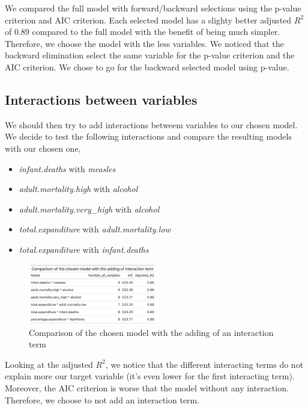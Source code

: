 We compared the full model with forward/backward selections using the p-value criterion and AIC criterion. Each selected model has a slighty better adjusted $R^2$ of $0.89$ compared to the full model with the benefit of being much simpler. Therefore, we choose the model with the less variables. We noticed that the backward elimination select the same variable for the p-value criterion and the AIC criterion. We chose to go for the backward selected model using p-value.

\subsection{Interactions between variables}

We should then try to add interactions betweem variables to our chosen model. We decide to test the following interactions and compare the resulting models with our chosen one,

\begin{itemize}
	\item \textit{infant.deaths} with \textit{measles}
	\item \textit{adult.mortality.high} with \textit{alcohol}
	\item \textit{adult.mortality.very\_high} with \textit{alcohol}
	\item \textit{total.expanditure} with \textit{adult.mortality.low}
	\item \textit{total.expanditure} with \textit{infant.deaths}
\end{itemize}

\begin{figure}[H]
	\centering
	\includegraphics[width=0.5\textwidth]{figures/models/models_interactions.png}
	\caption{Comparison of the chosen model with the adding of an interaction term}
	\label{fig:models_interaction}
\end{figure}

Looking at the adjusted $R^2$, we notice that the different interacting terms do not explain more our target variable (it's even lower for the first interacting term). Moreover, the AIC criterion is worse that the model without any interaction. Therefore, we choose to not add an interaction term.

